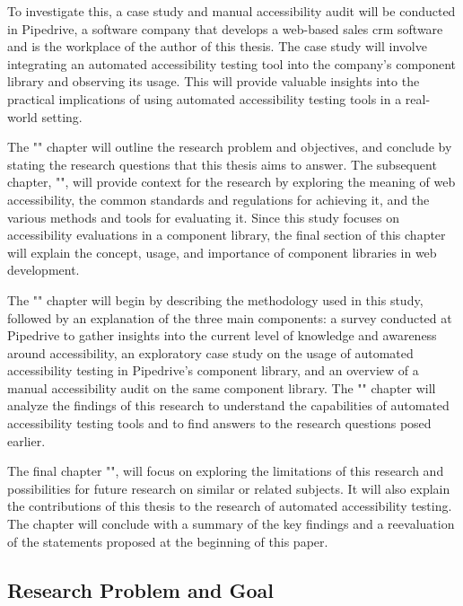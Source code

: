 \documentclass{master_thesis}
\begin{document}
To investigate this, a case study and manual accessibility audit will be conducted in Pipedrive, a software company that develops a web-based sales \ac{crm} software and is the workplace of the author of this thesis. The case study will involve integrating an automated accessibility testing tool into the company's component library and observing its usage. This will provide valuable insights into the practical implications of using automated accessibility testing tools in a real-world setting.


The "" chapter will outline the research problem and objectives, and conclude by stating the research questions that this thesis aims to answer. The subsequent chapter, "", will provide context for the research by exploring the meaning of web accessibility, the common standards and regulations for achieving it, and the various methods and tools for evaluating it. Since this study focuses on accessibility evaluations in a component library, the final section of this chapter will explain the concept, usage, and importance of component libraries in web development.

The "" chapter will begin by describing the methodology used in this study, followed by an explanation of the three main components: a survey conducted at Pipedrive to gather insights into the current level of knowledge and awareness around accessibility, an exploratory case study on the usage of automated accessibility testing in Pipedrive's component library, and an overview of a manual accessibility audit on the same component library. The "" chapter will analyze the findings of this research to understand the capabilities of automated accessibility testing tools and to find answers to the research questions posed earlier.

The final chapter "", will focus on exploring the limitations of this research and possibilities for future research on similar or related subjects. It will also explain the contributions of this thesis to the research of automated accessibility testing. The chapter will conclude with a summary of the key findings and a reevaluation of the statements proposed at the beginning of this paper.

\subsection{Research Problem and Goal}
\end{document}
